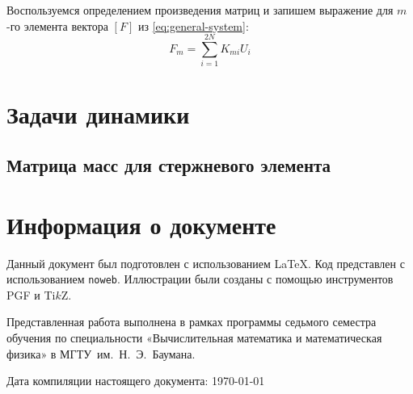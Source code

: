 \documentclass[10pt]{article}
\numberwithin{equation}{section}
\newcommand{\program}[1]{{\tt #1}}
\newcommand{\matr}[1]{[#1]}
\begin{document}
Воспользуемся определением произведения матриц и запишем выражение для
$m$-го элемента вектора $\matr{F}$ из \eqref{eq:general-system}:
\begin{equation*}
  F_m = \sum_{i=1}^{2N}{K_{mi}U_i}
\end{equation*}


\section{Задачи динамики}

\subsection{Матрица масс для стержневого элемента}

\clearpage
\appendix
\section{Информация о документе}

Данный документ был подготовлен с использованием \LaTeX{}. Код
представлен с использованием \program{noweb}. Иллюстрации были созданы
с помощью инструментов PGF и Ti$k$Z.

Представленная работа выполнена в рамках программы седьмого семестра
обучения по специальности «Вычислительная математика и математическая
физика» в МГТУ им. Н. Э. Баумана.

Дата компиляции настоящего документа: \today



\end{document}
